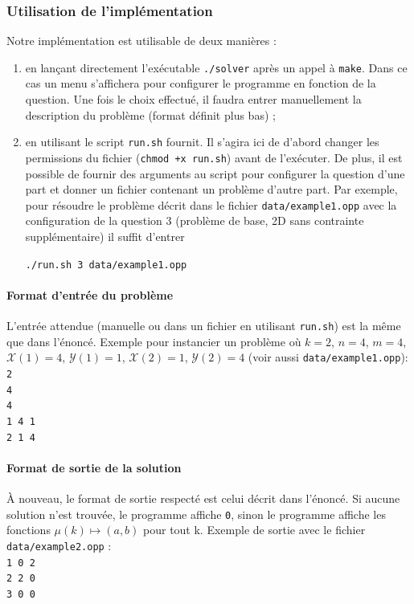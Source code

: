 \documentclass[a4paper]{article}
\begin{document}
\subsubsection{Utilisation de l'implémentation}
Notre implémentation est utilisable de deux manières :
\begin{enumerate}
	\item en lançant directement l'exécutable \texttt{./solver} après un appel à \texttt{make}. Dans ce cas un menu s'affichera pour configurer le programme en fonction de la question. Une fois le choix effectué, il faudra entrer manuellement la description du problème (format définit plus bas) ;
	\item en utilisant le script \texttt{run.sh} fournit. Il s'agira ici de d'abord changer les permissions du fichier (\texttt{chmod +x run.sh}) avant de l'exécuter. De plus, il est possible de fournir des arguments au script pour configurer la question d'une part et donner un fichier contenant un problème d'autre part. Par exemple, pour résoudre le problème décrit dans le fichier \texttt{data/example1.opp} avec la configuration de la question 3 (problème de base, 2D sans contrainte supplémentaire) il suffit d'entrer 
\begin{center}
\texttt{./run.sh 3 data/example1.opp}
\end{center}
\end{enumerate}

\paragraph{Format d'entrée du problème}
L'entrée attendue (manuelle ou dans un fichier en utilisant \texttt{run.sh}) est la même que dans l'énoncé. Exemple pour instancier un problème où $k=2$, $n=4$, $m=4$, $\mathcal{X}(1) = 4$, $\mathcal{Y}(1) = 1$, $\mathcal{X}(2) = 1$, $\mathcal{Y}(2) = 4$ (voir aussi \texttt{data/example1.opp}):
\texttt{\\2\\4\\4\\1 4 1\\2 1 4}

\paragraph{Format de sortie de la solution}
À nouveau, le format de sortie respecté est celui décrit dans l'énoncé. Si aucune solution n'est trouvée, le programme affiche \texttt{0}, sinon le programme affiche les fonctions $\mu(k) \mapsto (a,b)$ pour tout k. Exemple de sortie avec le fichier \texttt{data/example2.opp} :
\texttt{\\1 0 2\\2 2 0 \\3 0 0}
\end{document}

